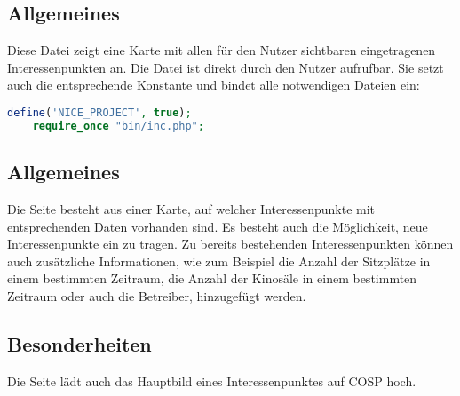 \subsection{Allgemeines} Diese Datei zeigt eine Karte mit allen für den Nutzer sichtbaren eingetragenen Interessenpunkten an.
Die Datei ist direkt durch den Nutzer aufrufbar. Sie setzt auch die entsprechende Konstante und bindet alle notwendigen Dateien ein:
\begin{lstlisting}[language=php]
	define('NICE_PROJECT', true);
	require_once "bin/inc.php";
\end{lstlisting}
\subsection{Allgemeines}
Die Seite besteht aus einer Karte, auf welcher Interessenpunkte mit entsprechenden Daten vorhanden sind. Es besteht auch die Möglichkeit, neue Interessenpunkte ein zu tragen. Zu bereits bestehenden Interessenpunkten können auch zusätzliche Informationen, wie zum Beispiel die Anzahl der Sitzplätze in einem bestimmten Zeitraum, die Anzahl der Kinosäle in einem bestimmten Zeitraum oder auch die Betreiber, hinzugefügt werden.
\subsection{Besonderheiten}
Die Seite lädt auch das Hauptbild eines Interessenpunktes auf {\glqq COSP\grqq} hoch.